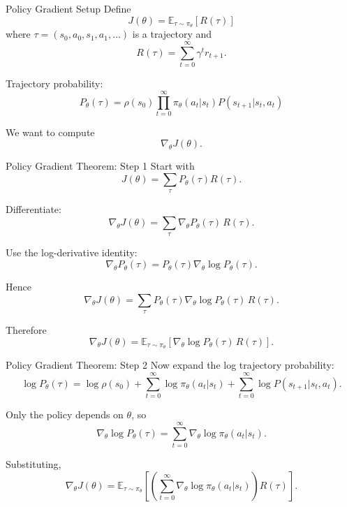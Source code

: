 \documentclass{beamer}
\begin{document}
\begin{frame}{Policy Gradient Setup}
  Define
  \[
  J(\theta)=\mathbb{E}_{\tau\sim \pi_\theta}[R(\tau)]
  \]
  where $\tau=(s_0,a_0,s_1,a_1,\dots)$ is a trajectory and
  \[
  R(\tau)=\sum_{t=0}^\infty \gamma^t r_{t+1}.
  \]

  Trajectory probability:
  \[
  P_\theta(\tau)=\rho(s_0)\prod_{t=0}^\infty \pi_\theta(a_t|s_t)P(s_{t+1}|s_t,a_t)
  \]

  We want to compute
  \[
  \nabla_\theta J(\theta).
  \]
\end{frame}

\begin{frame}{Policy Gradient Theorem: Step 1}
  Start with
  \[
  J(\theta)=\sum_\tau P_\theta(\tau)R(\tau).
  \]

  Differentiate:
  \[
  \nabla_\theta J(\theta)=\sum_\tau \nabla_\theta P_\theta(\tau)\,R(\tau).
  \]

  Use the log-derivative identity:
  \[
  \nabla_\theta P_\theta(\tau)=P_\theta(\tau)\nabla_\theta \log P_\theta(\tau).
  \]

  Hence
  \[
  \nabla_\theta J(\theta)=\sum_\tau P_\theta(\tau)\nabla_\theta \log P_\theta(\tau)\,R(\tau).
  \]

  Therefore
  \[
  \nabla_\theta J(\theta)=\mathbb{E}_{\tau\sim \pi_\theta}\left[\nabla_\theta \log P_\theta(\tau)\,R(\tau)\right].
  \]
\end{frame}

\begin{frame}{Policy Gradient Theorem: Step 2}
  Now expand the log trajectory probability:
  \[
  \log P_\theta(\tau)=\log \rho(s_0)+
  \sum_{t=0}^\infty \log \pi_\theta(a_t|s_t)+
  \sum_{t=0}^\infty \log P(s_{t+1}|s_t,a_t).
  \]

  Only the policy depends on $\theta$, so
  \[
  \nabla_\theta \log P_\theta(\tau)=
  \sum_{t=0}^\infty \nabla_\theta \log \pi_\theta(a_t|s_t).
  \]

  Substituting,
  \[
  \nabla_\theta J(\theta)=
  \mathbb{E}_{\tau\sim \pi_\theta}
  \left[
    \left(
    \sum_{t=0}^\infty \nabla_\theta \log \pi_\theta(a_t|s_t)
    \right)
    R(\tau)
    \right].
  \]
\end{frame}
\end{document}
